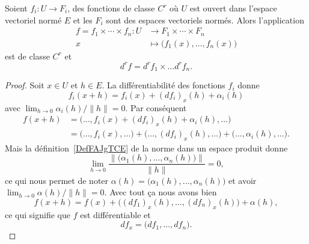 \begin{proposition} \label{PropOYtgIua}
	Soient \( f_i\colon U\to F_i\), des fonctions de classe \( C^r\) où \( U\) est ouvert dans l'espace vectoriel normé \( E\) et les \( F_i\) sont des espaces vectoriels normés. Alors l'application
	\begin{equation}
		\begin{aligned}
			f=f_1\times \cdots\times f_n\colon U & \to F_1\times \cdots\times F_n            \\
			x                                    & \mapsto \big( f_1(x),\ldots, f_n(x) \big)
		\end{aligned}
	\end{equation}
	est de classe \( C^r\) et
	\begin{equation}
		d^rf=d^rf_1\times\ldots d^rf_n.
	\end{equation}
\end{proposition}

\begin{proof}
	Soit \( x\in U\) et \( h\in E\). La différentiabilité des fonctions \( f_i\) donne
	\begin{equation}
		f_i(x+h)=f_i(x)+(df_i)_x(h)+\alpha_i(h)
	\end{equation}
	avec \( \lim_{h\to 0} \alpha_i(h)/\| h \|=0\). Par conséquent
	\begin{subequations}
		\begin{align}
			f(x+h) & =\big( \ldots, f_i(x)+(df_i)_x(h)+\alpha_i(h),\ldots \big)                                                        \\
			       & = \big( \ldots,f_i(x),\ldots \big)+ \big( \ldots,(df_i)_x(h),\ldots \big)+ \big( \ldots,\alpha_i(h),\ldots \big).
		\end{align}
	\end{subequations}
	Mais la définition~\ref{DefFAJgTCE} de la norme dans un espace produit donne
	\begin{equation}
		\lim_{h\to 0} \frac{ \| \big( \alpha_1(h),\ldots, \alpha_n(h) \big) \| }{ \| h \| }=0,
	\end{equation}
	ce qui nous permet de noter \( \alpha(h)=\big( \alpha_1(h),\ldots, \alpha_n(h) \big)\) et avoir \( \lim_{h\to 0} \alpha(h)/\| h \|=0\). Avec tout ça nous avons bien
	\begin{equation}
		f(x+h)=f(x)+\big( (df_1)_x(h),\ldots ,(df_n)_x(h) \big)+\alpha(h),
	\end{equation}
	ce qui signifie que \( f\) est différentiable et
	\begin{equation}
		df_x=\big( df_1,\ldots, df_n \big).
	\end{equation}
\end{proof}

